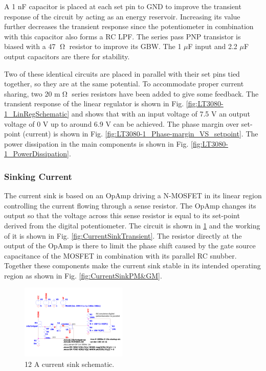A 1 nF capacitor is placed at each set pin to GND to improve the transient response of the circuit by acting as an energy reservoir. Increasing its value further decreases the transient response since the potentiometer in combination with this capacitor also forms a RC LPF. The series pass PNP transistor is biased with a 47 $\tcohm$ resistor to improve its GBW. The 1 $\mu$F input and 2.2 $\mu$F output capacitors are there for stability.

Two of these identical circuits are placed in parallel with their set pins tied together, so they are at the same potential. To accommodate proper current sharing, two 20 m$\tcohm$ series resistors have been added to give some feedback.
The transient response of the linear regulator is shown in Fig. \ref{fig:LT3080-1_LinRegSchematic} and shows that with an input voltage of 7.5 V an output voltage of 0 V up to around 6.9 V can be achieved. The phase margin over set-point (current) is shown in Fig. \ref{fig:LT3080-1_Phase-margin_VS_setpoint}. The power dissipation in the main components is shown in Fig. \ref{fig:LT3080-1_PowerDissipation}.

\subsubsection{Sinking Current}
The current sink is based on an OpAmp driving a N-MOSFET in its linear region controlling the current flowing through a sense resistor. The OpAmp changes its output so that the voltage across this sense resistor is equal to its set-point derived from the digital potentiometer. The circuit is shown in \ref{fig:CurrentSinkSchematic} and the working of it is shown in Fig. \ref{fig:CurrentSinkTransient}. The resistor directly at the output of the OpAmp is there to limit the phase shift caused by the gate source capacitance of the MOSFET in combination with its parallel RC snubber. Together these components make the current sink stable in its intended operating region as shown in Fig. \ref{fig:CurrentSinkPM&GM}.

\begin{figure}[h!]
    \centering
    \includegraphics[width=0.45\textwidth]{CurrentSinkSchematic.pdf}
    \caption{12 A current sink schematic.}
    \label{fig:CurrentSinkSchematic}
\end{figure}

